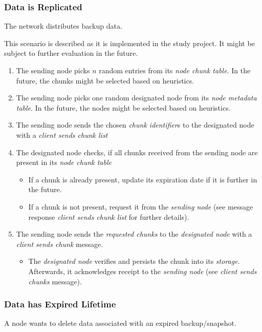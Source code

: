 \subsubsection{Data is Replicated}\label{sec:scenario-data-replication}
The network distributes backup data.

This scenario is described as it is implemented in the study project. It might be subject to further evaluation in the future.

\begin{enumerate}
    \item The sending node picks $n$ random entries from its \emph{node chunk table}. In the future, the chunks might be selected based on heuristics.
    \item The sending node picks one random designated node from its \emph{node metadata table}. In the future, the nodes might be selected based on heuristics. %
    \item The sending node sends the chosen \emph{chunk identifier}s to the designated node with a \emph{client sends chunk list} %
    \item The designated node checks, if all chunks received from the sending node are present in its \emph{node chunk table}
        \begin{itemize}
            \item If a chunk is already present, update its expiration date if it is further in the future.
            \item If a chunk is not present, request it from the \emph{sending node} (see message response \emph{client sends chunk list} for further details).
        \end{itemize}
    \item The sending node sends the \emph{requested chunks} to the \emph{designated node} with a \emph{client sends chunk} message. %
        \begin{itemize}
            \item The \emph{designated node} verifies and persists the chunk into its \emph{storage}. Afterwards, it acknowledges receipt to the \emph{sending node} (see \emph{client sends chunks} message).
        \end{itemize}
\end{enumerate}

\subsubsection{Data has Expired Lifetime}\label{sec:scenario-data-expiration}
A node wants to delete data associated with an expired backup/snapshot.

